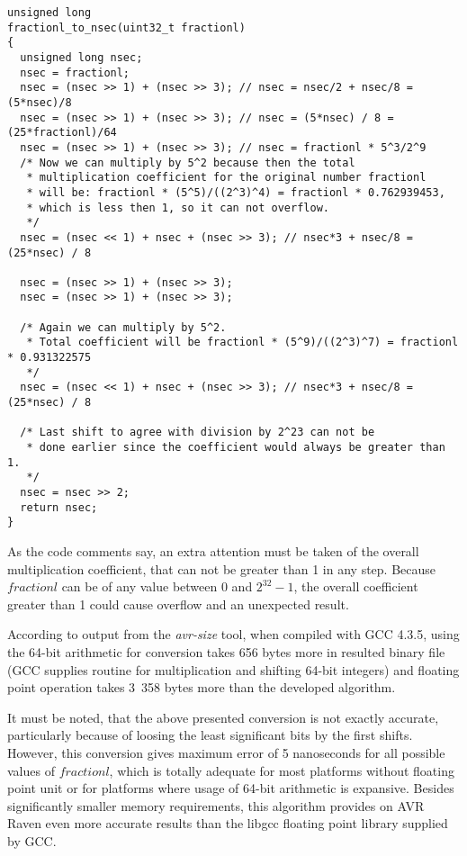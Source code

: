 \begin{lstlisting}[caption=Conversion from NTP fraction part to nanoseconds]
unsigned long
fractionl_to_nsec(uint32_t fractionl)
{
  unsigned long nsec;
  nsec = fractionl;
  nsec = (nsec >> 1) + (nsec >> 3); // nsec = nsec/2 + nsec/8 = (5*nsec)/8
  nsec = (nsec >> 1) + (nsec >> 3); // nsec = (5*nsec) / 8 = (25*fractionl)/64
  nsec = (nsec >> 1) + (nsec >> 3); // nsec = fractionl * 5^3/2^9
  /* Now we can multiply by 5^2 because then the total
   * multiplication coefficient for the original number fractionl
   * will be: fractionl * (5^5)/((2^3)^4) = fractionl * 0.762939453,
   * which is less then 1, so it can not overflow.
   */
  nsec = (nsec << 1) + nsec + (nsec >> 3); // nsec*3 + nsec/8 = (25*nsec) / 8

  nsec = (nsec >> 1) + (nsec >> 3);
  nsec = (nsec >> 1) + (nsec >> 3);

  /* Again we can multiply by 5^2.
   * Total coefficient will be fractionl * (5^9)/((2^3)^7) = fractionl * 0.931322575
   */
  nsec = (nsec << 1) + nsec + (nsec >> 3); // nsec*3 + nsec/8 = (25*nsec) / 8

  /* Last shift to agree with division by 2^23 can not be
   * done earlier since the coefficient would always be greater than 1.
   */
  nsec = nsec >> 2;
  return nsec;
}
\end{lstlisting}
As the code comments say, an extra attention must be taken of the overall
multiplication coefficient,
that can not be greater than 1 in any step.
Because $fractionl$ can be of any value between $0$ and $2^{32}-1$,
the overall coefficient greater than 1 could cause overflow and an unexpected result.

According to output from the {\it{avr-size}} tool,
when compiled with GCC 4.3.5,
using the 64-bit arithmetic for conversion
takes 656 bytes more in %
resulted binary file (GCC supplies routine for multiplication and shifting 64-bit integers)
and floating point operation takes 3~358 bytes more
than the developed algorithm.

It must be noted, that the above presented conversion is not exactly accurate, particularly
because of loosing the least significant bits by the first shifts.
However, this conversion gives maximum error of 5 nanoseconds for all possible values of $fractionl$,
which is totally adequate for most platforms without floating point unit or
for platforms where usage of 64-bit arithmetic is expansive.
Besides significantly smaller memory requirements,
this algorithm provides on AVR Raven even more accurate results than the libgcc
floating point library supplied by GCC.


